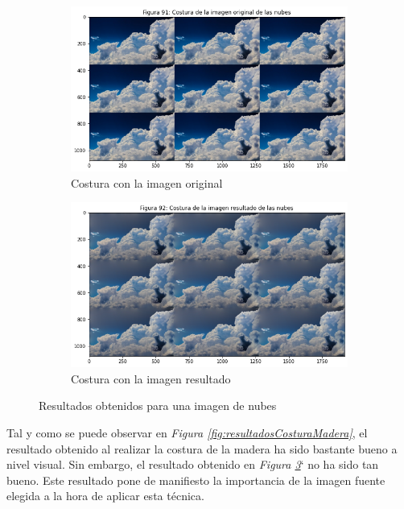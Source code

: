 \documentclass[11pt,twoside,titlepage,a4paper]{article}
\numberwithin{equation}{section} %
\theoremstyle{usual}
\begin{document}
\begin{figure}[h]
    \centering
    \begin{subfigure}[t]{.45\textwidth}
        \centering
        \includegraphics[width=\textwidth]{imagenes/PoissonImageEditing_cell_95_output_2.png}
        \caption{Costura con la imagen original}
        \label{fig:nubesCosturaOrigninal}
    \end{subfigure}
    \centering
    \begin{subfigure}[t]{.45\textwidth}
        \centering
        \includegraphics[width=\textwidth]{imagenes/PoissonImageEditing_cell_95_output_3.png}
        \caption{Costura con la imagen resultado}
        \label{fig:nubesCosturaResultado}
    \end{subfigure}
    \caption{Resultados obtenidos para una imagen de nubes}
    \label{fig:resultadosCosturaNubes}
\end{figure}

Tal y como se puede observar en \textit{Figura \ref{fig:resultadosCosturaMadera}}, el resultado obtenido al realizar la costura de la madera ha sido bastante bueno a nivel visual. Sin embargo, el resultado obtenido en \textit{Figura \ref{fig:resultadosCosturaNubes}}` no ha sido tan bueno. Este resultado pone de manifiesto la importancia de la imagen fuente elegida a la hora de aplicar esta técnica.
\end{document}
